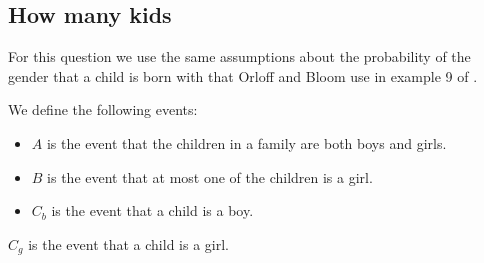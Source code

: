 \documentclass[a4paper,11pt]{article}
\begin{document}
\subsection{How many kids}
For this question we use the same assumptions about the probability of the
gender that a child is born with that Orloff and Bloom use in example 9 of
\cite{reading4a}.

We define the following events:

\begin{itemize}
\item $A$ is the event that the children in a family are both boys and girls.
\item $B$ is the event that at most one of the children is a girl.
\item $C_{b}$ is the event that a child is a boy.
\end{itemize}


\item $C_{g}$ is the event that a child is a girl.


\printbibliography{}
\end{document}
